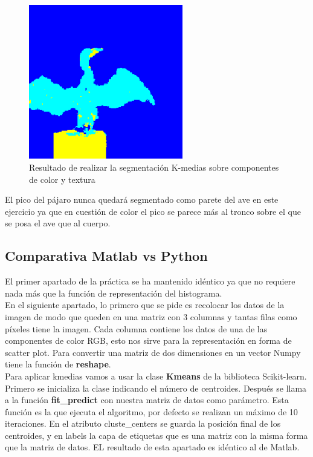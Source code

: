 \documentclass[a4paper,12pt]{report}
\begin{document}
\begin{figure}[h]
\centering
\includegraphics[width=0.6\textwidth]{imagenes/segmentacionabe}
\caption{Resultado de realizar la segmentación K-medias sobre componentes de color y textura}
\label{segmentacionabe}
\end{figure}

El pico del pájaro nunca quedará segmentado como parete del ave en este ejercicio ya que en cuestión de color el pico se parece más al tronco sobre el que se posa el ave que al cuerpo.\\


\subsection{Comparativa Matlab vs Python}

El primer apartado de la práctica se ha mantenido idéntico ya que no requiere nada más que la función de representación del histograma.\\

En el siguiente apartado, lo primero que se pide es recolocar los datos de la imagen de modo que queden en una matriz con 3 columnas y tantas filas como píxeles tiene la imagen. Cada columna contiene los datos de una de las componentes de color RGB, esto nos sirve para la representación en forma de scatter plot. Para convertir una matriz de dos dimensiones en un vector Numpy tiene la función de \textbf{reshape}. \\

Para aplicar kmedias vamos a usar la clase \textbf{Kmeans} de la biblioteca Scikit-learn. Primero se inicializa la clase indicando el número de centroides. Después se llama a la función \textbf{fit\_predict} con nuestra matriz de datos como parámetro. Esta función es la que ejecuta el algoritmo, por defecto se realizan un máximo de 10 iteraciones. En el atributo cluste\_centers se guarda la posición final de los centroides, y en labels la capa de etiquetas que es una matriz con la misma forma que la matriz de datos. EL resultado de esta apartado es idéntico al de Matlab. \\
\end{document}
